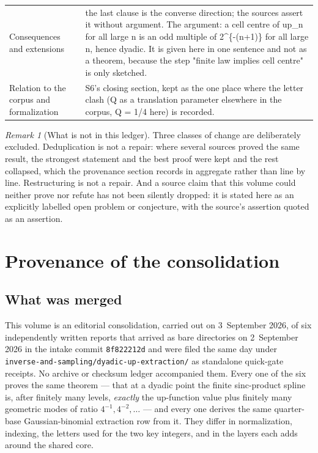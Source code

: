 \documentclass[11pt,oneside]{article}
\theoremstyle{plain}
\theoremstyle{definition}
\theoremstyle{remark}
\newtheorem{remark}[theorem]{Remark}
\begin{document}
\begin{longtable}{@{}p{} p{}@{}}
Consequences and extensions & the last clause is the converse direction; the sources assert it without argument. The argument: a cell centre of up\_n for all large n is an odd multiple of 2\textasciicircum \{-(n+1)\} for all large n, hence dyadic. It is given here in one sentence and not as a theorem, because the step "finite law implies cell centre" is only sketched.\\
Relation to the corpus and formalization & S6's closing section, kept as the one place where the letter clash (Q as a translation parameter elsewhere in the corpus, Q = 1/4 here) is recorded.\\
\bottomrule
\end{longtable}

\begin{remark}[What is not in this ledger]
\label{due:rmk:repairs-scope}
Three classes of change are deliberately excluded.  Deduplication is not a
repair: where several sources proved the same result, the strongest statement
and the best proof were kept and the rest collapsed, which the provenance
section records in aggregate rather than line by line.  Restructuring is not a
repair.  And a source claim that this volume could neither prove nor refute has
not been silently dropped: it is stated here as an explicitly labelled open
problem or conjecture, with the source's assertion quoted as an assertion.
\end{remark}

\section{Provenance of the consolidation}
\label{due:sec:provenance}

\subsection{What was merged}

This volume is an editorial consolidation, carried out on 3~September 2026, of
six independently written reports that arrived as bare directories on
2~September 2026 in the intake commit
\texttt{8f822212d} and were filed the same day under
\texttt{inverse-\allowbreak and-\allowbreak sampling/dyadic-\allowbreak up-\allowbreak extraction/} as standalone quick-gate
receipts.  No archive or checksum ledger accompanied them.  Every one of the
six proves the same theorem --- that at a dyadic point the finite
sinc-product spline is, after finitely many levels, \emph{exactly} the
up-function value plus finitely many geometric modes of ratio \(4^{-1},
4^{-2},\ldots\) --- and every one derives the same quarter-base
Gaussian-binomial extraction row from it.  They differ in normalization,
indexing, the letters used for the two key integers, and in the layers each
adds around the shared core.
\end{document}
